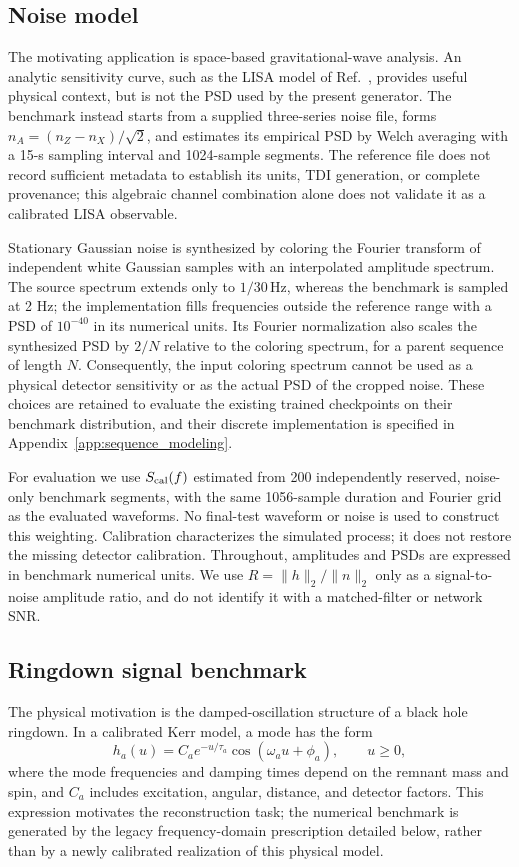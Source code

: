 \documentclass[10pt,prd,aps,a4paper,twocolumn,superscriptaddress,nofootinbib,floatfix]{revtex4-2}
\begin{document}
\subsection{Noise model}\label{noise model}
The motivating application is space-based gravitational-wave analysis. An analytic sensitivity curve, such as the LISA model of Ref.~\cite{robson2019construction}, provides useful physical context, but is not the PSD used by the present generator. The benchmark instead starts from a supplied three-series noise file, forms $n_A=(n_Z-n_X)/\sqrt{2}$, and estimates its empirical PSD by Welch averaging with a 15-s sampling interval and 1024-sample segments. The reference file does not record sufficient metadata to establish its units, TDI generation, or complete provenance; this algebraic channel combination alone does not validate it as a calibrated LISA observable.

Stationary Gaussian noise is synthesized by coloring the Fourier transform of independent white Gaussian samples with an interpolated amplitude spectrum. The source spectrum extends only to $1/30\,\mathrm{Hz}$, whereas the benchmark is sampled at 2 Hz; the implementation fills frequencies outside the reference range with a PSD of $10^{-40}$ in its numerical units. Its Fourier normalization also scales the synthesized PSD by $2/N$ relative to the coloring spectrum, for a parent sequence of length $N$. Consequently, the input coloring spectrum cannot be used as a physical detector sensitivity or as the actual PSD of the cropped noise. These choices are retained to evaluate the existing trained checkpoints on their benchmark distribution, and their discrete implementation is specified in Appendix~\ref{app:sequence_modeling}.

For evaluation we use $S_{\rm cal}(f)$ estimated from 200 independently reserved, noise-only benchmark segments, with the same 1056-sample duration and Fourier grid as the evaluated waveforms. No final-test waveform or noise is used to construct this weighting. Calibration characterizes the simulated process; it does not restore the missing detector calibration. Throughout, amplitudes and PSDs are expressed in benchmark numerical units. We use $R=\|h\|_2/\|n\|_2$ only as a signal-to-noise amplitude ratio, and do not identify it with a matched-filter or network SNR.

\subsection{Ringdown signal benchmark}
The physical motivation is the damped-oscillation structure of a black hole ringdown. In a calibrated Kerr model, a mode has the form~\cite{berti2006gravitational,berti2009qnm}
\begin{equation}
h_a(u)=C_a e^{-u/\tau_a}\cos(\omega_a u+\phi_a),\qquad u\geq0,
\end{equation}
where the mode frequencies and damping times depend on the remnant mass and spin, and $C_a$ includes excitation, angular, distance, and detector factors. This expression motivates the reconstruction task; the numerical benchmark is generated by the legacy frequency-domain prescription detailed below, rather than by a newly calibrated realization of this physical model.
\end{document}
